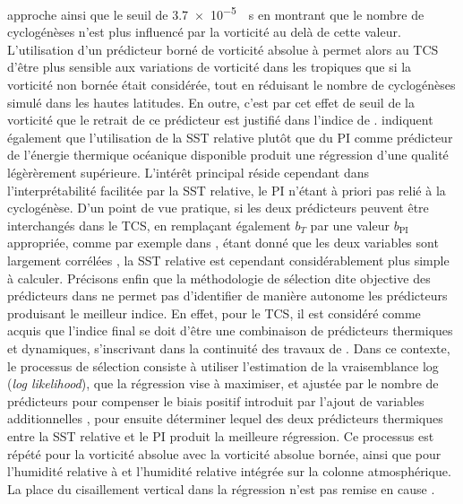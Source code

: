 \documentclass[../main.tex]{subfiles}
\begin{document}
approche ainsi que le seuil de \SI{3.7e-5}{\per\second} en montrant que le nombre de cyclogénèses n'est plus influencé par la vorticité au delà de cette valeur.
L'utilisation d'un prédicteur borné de vorticité absolue à  permet alors au TCS d'être plus sensible aux variations de vorticité dans les tropiques que
si la vorticité non bornée était considérée, tout en réduisant le nombre de cyclogénèses simulé dans les hautes latitudes. En outre, c'est par cet effet de
seuil de la vorticité que le retrait de ce prédicteur est justifié dans l'indice de \textcite{bruyere_investigating_2012}. \citeauthor{tippett_poisson_2011}
indiquent également que l'utilisation de la SST relative plutôt que du PI comme prédicteur de l'énergie thermique océanique disponible produit une régression
d'une qualité légèrèrement supérieure. L'intérêt principal réside cependant dans l'interprétabilité facilitée par la SST relative, le PI n'étant à priori pas
relié à la cyclogénèse. D'un point de vue pratique, si les deux prédicteurs peuvent être interchangés dans le TCS, en remplaçant également $b_T$ par une valeur
$b_{\mathrm{PI}}$ appropriée, comme par exemple dans \textcite{camargo_testing_2014,camargo_tropical_2016}, étant donné que les deux variables sont largement
corrélées \parencite{vecchi_effect_2007,swanson_nonlocality_2008}, la SST relative est cependant considérablement plus simple à calculer. Précisons enfin que la
méthodologie de sélection dite objective des prédicteurs dans \textcite{tippett_poisson_2011} ne permet pas d'identifier de manière autonome les prédicteurs
produisant le meilleur indice. En effet, pour le TCS, il est considéré comme acquis que l'indice final se doit d'être une combinaison de prédicteurs thermiques
et dynamiques, s'inscrivant dans la continuité des travaux de \textcite{gray_tropical_1975}. Dans ce contexte, le processus de sélection consiste à utiliser
l'estimation de la vraisemblance log (\textit{log likelihood}), que la régression vise à maximiser, et ajustée par le nombre de prédicteurs pour compenser le
biais positif introduit par l'ajout de variables additionnelles \parencite{akaike_information_1998}, pour ensuite déterminer lequel des deux prédicteurs
thermiques entre la SST relative et le PI produit la meilleure régression. Ce processus est répété pour la vorticité absolue avec la vorticité absolue bornée,
ainsi que pour l'humidité relative à  et l'humidité relative intégrée sur la colonne atmosphérique. La place du cisaillement vertical dans la
régression n'est pas remise en cause \parencite{gray_global_1968}.
%
\end{document}
